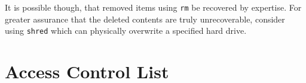It is possible though, that removed items using \verb|rm| be recovered by expertise. For greater assurance that the deleted contents are truly unrecoverable, consider using \verb|shred| which can physically overwrite a specified hard drive.

















\section{Access Control List}


